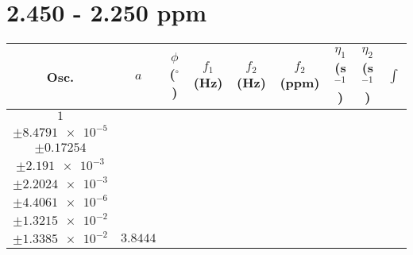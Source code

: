 \documentclass[8pt]{article}
\begin{document}
\section*{2.450 - 2.250 ppm}
\begin{longtable}[l]{c c c c c c c c c}
\toprule
Osc. & $a$ & $\phi$ ($^{\circ}$) & $f_1$ (Hz) & $f_2$ (Hz) & $f_2$ (ppm) & $\eta_1$ (s$^{-1}$) & $\eta_2$ (s$^{-1}$) & $\int$\\
\midrule
$\num{1}$ & \begin{tabular}[c]{@{}c@{}}$\num{2.9173e-2}$ \\ $\pm\num{8.4791e-5}$\end{tabular} & \begin{tabular}[c]{@{}c@{}}$\num{-1.0124}$ \\ $\pm\num{0.17254}$\end{tabular} & \begin{tabular}[c]{@{}c@{}}$\num{-11.408}$ \\ $\pm\num{2.191e-3}$\end{tabular} & \begin{tabular}[c]{@{}c@{}}$\num{1.1683e+3}$ \\ $\pm\num{2.2024e-3}$\end{tabular} & \begin{tabular}[c]{@{}c@{}}$\num{2.3372}$ \\ $\pm\num{4.4061e-6}$\end{tabular} & \begin{tabular}[c]{@{}c@{}}$\num{3.8764}$ \\ $\pm\num{1.3215e-2}$\end{tabular} & \begin{tabular}[c]{@{}c@{}}$\num{3.9142}$ \\ $\pm\num{1.3385e-2}$\end{tabular} & $\num{3.8444}$\\

\end{longtable}
\end{document}
